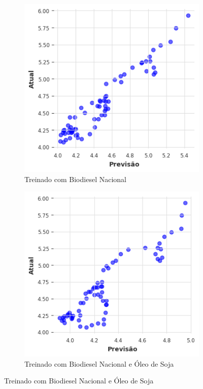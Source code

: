 \begin{figure}[htbp]
	\centering
	\begin{subfigure}[b]{0.40\textwidth}
		\centering
		\includegraphics[width=\textwidth]{figuras/mlp_brasil_scatter.png} %
		\caption{Treinado com Biodiesel Nacional \newline}
		\label{fig:mlp_brasil_scatter}
	\end{subfigure}
	\hfill
	\begin{subfigure}[b]{0.40\textwidth}
		\centering
		\includegraphics[width=\textwidth]{figuras/mlp_brasil_oil_scatter.png} %
		\caption{Treinado com Biodiesel Nacional e Óleo de Soja}
		\label{fig:mlp_brasil_oil_scatter}
	\end{subfigure}


\end{figure}
